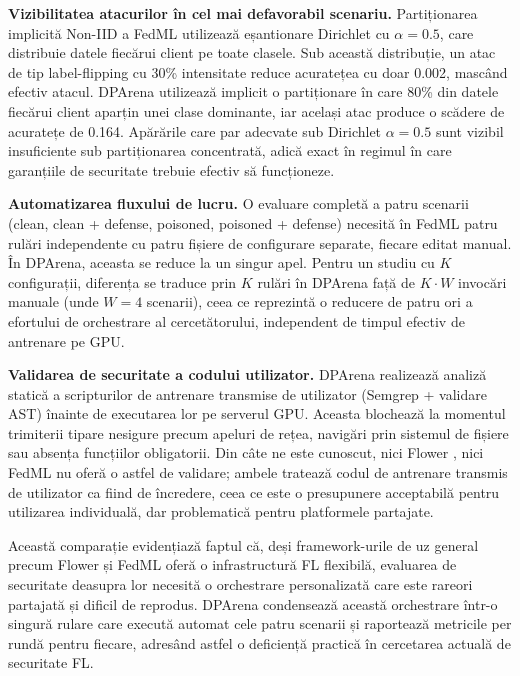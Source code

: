 \documentclass[../../main.tex]{subfiles}
\begin{document}
        \textbf{Vizibilitatea atacurilor în cel mai defavorabil scenariu.} Partiționarea implicită Non-IID a FedML utilizează eșantionare Dirichlet cu $\alpha = 0.5$, care distribuie datele fiecărui client pe toate clasele. Sub această distribuție, un atac de tip label-flipping cu 30\% intensitate reduce acuratețea cu doar 0.002, mascând efectiv atacul. DPArena utilizează implicit o partiționare în care 80\% din datele fiecărui client aparțin unei clase dominante, iar același atac produce o scădere de acuratețe de 0.164. Apărările care par adecvate sub Dirichlet $\alpha = 0.5$ sunt vizibil insuficiente sub partiționarea concentrată, adică exact în regimul în care garanțiile de securitate trebuie efectiv să funcționeze.

        \textbf{Automatizarea fluxului de lucru.} O evaluare completă a patru scenarii (clean, clean + defense, poisoned, poisoned + defense) necesită în FedML patru rulări independente cu patru fișiere de configurare separate, fiecare editat manual. În DPArena, aceasta se reduce la un singur apel. Pentru un studiu cu $K$ configurații, diferența se traduce prin $K$ rulări în DPArena față de $K \cdot W$ invocări manuale (unde $W = 4$ scenarii), ceea ce reprezintă o reducere de patru ori a efortului de orchestrare al cercetătorului, independent de timpul efectiv de antrenare pe GPU.

        \textbf{Validarea de securitate a codului utilizator.} DPArena realizează analiză statică a scripturilor de antrenare transmise de utilizator (Semgrep + validare AST) înainte de executarea lor pe serverul GPU. Aceasta blochează la momentul trimiterii tipare nesigure precum apeluri de rețea, navigări prin sistemul de fișiere sau absența funcțiilor obligatorii. Din câte ne este cunoscut, nici Flower \cite{beutel2020flower}, nici FedML \cite{he2020fedml} nu oferă o astfel de validare; ambele tratează codul de antrenare transmis de utilizator ca fiind de încredere, ceea ce este o presupunere acceptabilă pentru utilizarea individuală, dar problematică pentru platformele partajate.

        Această comparație evidențiază faptul că, deși framework-urile de uz general precum Flower și FedML oferă o infrastructură FL flexibilă, evaluarea de securitate deasupra lor necesită o orchestrare personalizată care este rareori partajată și dificil de reprodus. DPArena condensează această orchestrare într-o singură rulare care execută automat cele patru scenarii și raportează metricile per rundă pentru fiecare, adresând astfel o deficiență practică în cercetarea actuală de securitate FL.
\end{document}
